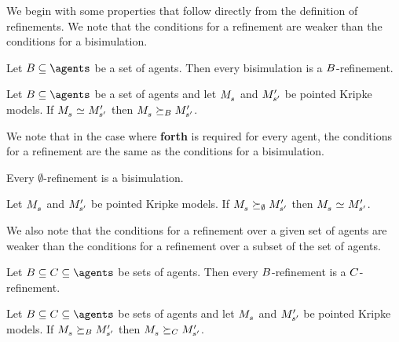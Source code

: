 We begin with some properties that follow directly from the definition of refinements.
We note that the conditions for a refinement are weaker than the conditions for a bisimulation. 

\begin{proposition}\label{bisimulation-refinement}
Let $\agentsB \subseteq \agents$ be a set of agents. Then every bisimulation is a $B$-refinement.
\end{proposition}

\begin{corollary}\label{bisimilar-refinement}
Let $\agentsB \subseteq \agents$ be a set of agents and let $\kPModel{\kStateS}$ and ${M^{\prime}_{{s}^{\prime}}}$ be pointed Kripke models.
If $\kPModel{\kStateS} \bisimilar \kPModelP{\kStateSP}$ then $\kPModel{\kStateS} \simulatesBs \kPModelP{\kStateSP}$.
\end{corollary}

We note that in the case where {\bf forth} is required for every agent, the conditions for a refinement are the same as the conditions for a bisimulation.

\begin{proposition}\label{refinement-bisimulation}
Every $\emptyset$-refinement is a bisimulation.
\end{proposition}

\begin{corollary}\label{refinement-bisimilar}
Let $\kPModel{\kStateS}$ and ${M^{\prime}_{{s}^{\prime}}}$ be pointed Kripke models.
If $\kPModel{\kStateS} \simulates[\emptyset] \kPModelP{\kStateSP}$ then $\kPModel{\kStateS} \bisimilar \kPModelP{\kStateSP}$.
\end{corollary}

We also note that the conditions for a refinement over a given set of agents are weaker than the conditions for a refinement over a subset of the set of agents.

\begin{proposition}
Let $\agentsB \subseteq \agentsC \subseteq \agents$ be sets of agents.
Then every $B$-refinement is a $C$-refinement.
\end{proposition}

\begin{corollary}
Let $\agentsB \subseteq \agentsC \subseteq \agents$ be sets of agents and let $\kPModel{\kStateS}$ and ${M^{\prime}_{{s}^{\prime}}}$ be pointed Kripke models.
If $\kPModel{\kStateS} \simulatesBs \kPModelP{\kStateSP}$ then $\kPModel{\kStateS} \simulatesCs \kPModelP{\kStateSP}$.
\end{corollary}

